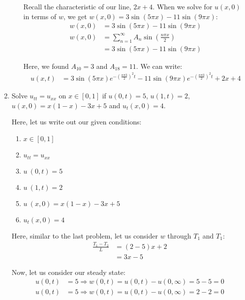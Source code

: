 \documentclass{article}
\begin{document}
\begin{enumerate}
\begin{enumerate}
  Recall the characteristic of our line, $2x + 4$. When we solve for $u(x, 0)$ in terms of $w$, we get $w(x, 0) = 3 \sin(5 \pi x) - 11 \sin(9 \pi x)$:
  \begin{align}
    w(x, 0) & =
    3 \sin(5 \pi x) - 11 \sin(9 \pi x)\\
    w(x, 0) & =
    \sum^\infty_{n = 1}
    A_n \sin\left(\frac{n \pi x}{2}\right)\\
    & = 3\sin(5 \pi x) - 11\sin(9 \pi x)
  \end{align}

  Here, we found $A_{10} = 3$ and $A_{18} = 11$. We can write:
  \begin{align}
    u(x, t) & = 3\sin(5 \pi x)e^{- \left( \frac{n \pi 3}{2} \right)^2 t} - 11\sin(9 \pi x)e^{- \left( \frac{n \pi 3}{2} \right)^2 t} + 2x + 4
  \end{align}
\end{enumerate}

\newpage
\setcounter{equation}{0}
  \item Solve $u_{tt} = u_{xx}$ on $x \in [0, 1]$ if $u(0, t) = 5$, $u(1, t) = 2$, $u(x, 0) = x(1 - x) - 3x + 5$ and $u_t(x, 0) = 4$.

  Here, let us write out our given conditions:
  \begin{enumerate}
    \item $x \in [0, 1]$
    \item $u_{tt} = u_{xx}$
    \item $u\ (0, t) = 5$
    \item $u\ (1, t) = 2$
    \item $u\ (x, 0) = x(1 - x) - 3x + 5$
    \item $u_t(x, 0) = 4$
  \end{enumerate}

  Here, similar to the last problem, let us consider $w$ through $T_1$ and $T_1$:
  \begin{align}
    \frac{T_1 - T_2}{L} & = (2 - 5)x + 2\\
    & = 3x - 5
  \end{align}

  Now, let us consider our steady state:
  \begin{align}
    u(0, t) & = 5 \Rightarrow w(0, t) = u(0, t) - u(0, \infty) = 5 - 5 = 0\\
    u(0, t) & = 5 \Rightarrow w(0, t) = u(0, t) - u(0, \infty) = 2 - 2 = 0
  \end{align}


\end{enumerate}
\end{document}
